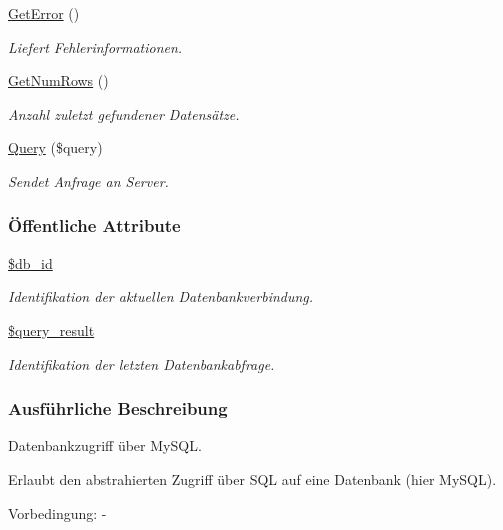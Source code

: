 \begin{CompactItemize}
\hyperlink{classSQLDB_efc9afe11649d6cdae21575717ec3436}{Get\-Error} ()
\begin{CompactList}\small\item\em Liefert Fehlerinformationen. \item\end{CompactList}\item 
\hyperlink{classSQLDB_15b181251b309ab55331be29fa33ac9f}{Get\-Num\-Rows} ()
\begin{CompactList}\small\item\em Anzahl zuletzt gefundener Datensätze. \item\end{CompactList}\item 
\hyperlink{classSQLDB_fc6ffa8df50f68f07d9f5e3385b96d7a}{Query} (\$query)
\begin{CompactList}\small\item\em Sendet Anfrage an Server. \item\end{CompactList}\end{CompactItemize}
\subsubsection*{\"{O}ffentliche Attribute}
\begin{CompactItemize}
\item 
\hyperlink{classSQLDB_2c62843044a6ec53ad3384fb36aa811b}{\$db\_\-id}
\begin{CompactList}\small\item\em Identifikation der aktuellen Datenbankverbindung. \item\end{CompactList}\item 
\hyperlink{classSQLDB_879fa41a3df6664f4ce83960808326ab}{\$query\_\-result}
\begin{CompactList}\small\item\em Identifikation der letzten Datenbankabfrage. \item\end{CompactList}\end{CompactItemize}


\subsubsection{Ausf\"{u}hrliche Beschreibung}
Datenbankzugriff über My\-SQL. 

Erlaubt den abstrahierten Zugriff über SQL auf eine Datenbank (hier My\-SQL). \begin{Desc}
\item[Vorbedingung:]- \end{Desc}




